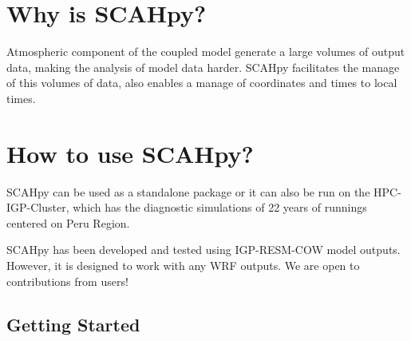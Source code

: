 \documentclass[
  letterpaper,
  DIV=11,
  numbers=noendperiod]{scrreprt}
\begin{document}
\hypertarget{why-is-scahpy}{%
\section*{\texorpdfstring{\textbf{Why is
SCAHpy?}}{Why is SCAHpy?}}\label{why-is-scahpy}}


Atmospheric component of the coupled model generate a large volumes of
output data, making the analysis of model data harder. SCAHpy
facilitates the manage of this volumes of data, also enables a manage of
coordinates and times to local times.

\hypertarget{how-to-use-scahpy}{%
\section*{\texorpdfstring{\textbf{How to use
SCAHpy?}}{How to use SCAHpy?}}\label{how-to-use-scahpy}}


SCAHpy can be used as a standalone package or it can also be run on the
HPC-IGP-Cluster, which has the diagnostic simulations of 22 years of
runnings centered on Peru Region.

\begin{tcolorbox}[enhanced jigsaw, breakable, opacitybacktitle=0.6, colframe=quarto-callout-note-color-frame, left=2mm, toptitle=1mm, arc=.35mm, rightrule=.15mm, toprule=.15mm, opacityback=0, leftrule=.75mm, colbacktitle=quarto-callout-note-color!10!white, title=\textcolor{quarto-callout-note-color}{\faInfo}\hspace{0.5em}{Note}, titlerule=0mm, bottomtitle=1mm, bottomrule=.15mm, colback=white, coltitle=black]

SCAHpy has been developed and tested using IGP-RESM-COW model outputs.
However, it is designed to work with any WRF outputs. We are open to
contributions from users!

\end{tcolorbox}

\hypertarget{getting-started-1}{%
\subsection*{\texorpdfstring{\textbf{Getting
Started}}{Getting Started}}\label{getting-started-1}}
\end{document}
